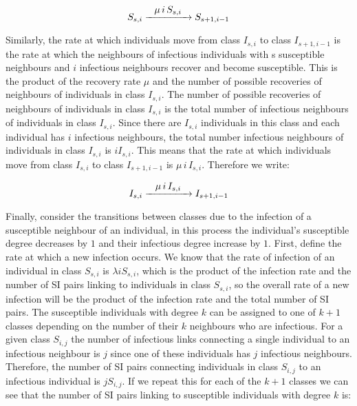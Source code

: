 \documentclass{uonmathsreport}
\begin{document}
\begin{equation}
S_{s,i}\xrightarrow{\makebox[1.5cm]{$\mu\,i\,S_{s,i}$}}S_{s+1,i-1}
\end{equation}

Similarly, the rate at which individuals move from class $I_{s,i}$ to class $I_{s+1,i-1}$ is the rate at which the neighbours of infectious individuals with s susceptible neighbours and $i$ infectious neighbours recover and become susceptible. This is the product of the recovery rate $\mu$ and the number of possible recoveries of neighbours of individuals in class $I_{s,i}$. The number of possible recoveries of neighbours of individuals in class $I_{s,i}$ is the total number of infectious neighbours of individuals in class $I_{s,i}$. Since there are $I_{s,i}$ individuals in this class and each individual has $i$ infectious neighbours, the total number infectious neighbours of individuals in class $I_{s,i}$ is $i I_{s,i}$. This means that the rate at which individuals move from class $I_{s,i}$ to class $I_{s+1,i-1}$ is $\mu\, i\, I_{s,i}$. Therefore we write:

\begin{equation}
I_{s,i}\xrightarrow{\makebox[1.5cm]{$\mu\,i\,I_{s,i}$}}I_{s+1,i-1}
\end{equation}

Finally, consider the transitions between classes due to the infection of a susceptible neighbour of an individual, in this process the individual's susceptible degree decreases by $1$ and their infectious degree increase by $1$. First, define the rate at which a new infection occurs. We know that the rate of infection of an individual in class $S_{s,i}$ is $\lambda i S_{s,i}$, which is the product of the infection rate and the number of SI pairs linking to individuals in class $S_{s,i}$, so the overall rate of a new infection will be the product of the infection rate and the total number of SI pairs. The susceptible individuals with degree $k$ can be assigned to one of $k+1$ classes depending on the number of their $k$ neighbours who are infectious. For a given class $S_{i,j}$ the number of infectious links connecting a single individual to an infectious neighbour is $j$ since one of these individuals has $j$ infectious neighbours. Therefore, the number of SI pairs connecting individuals in class $S_{i,j}$ to an infectious individual is $jS_{i,j}$. If we repeat this for each of the $k+1$ classes we can see that the number of SI pairs linking to susceptible individuals with degree $k$ is:
\end{document}
